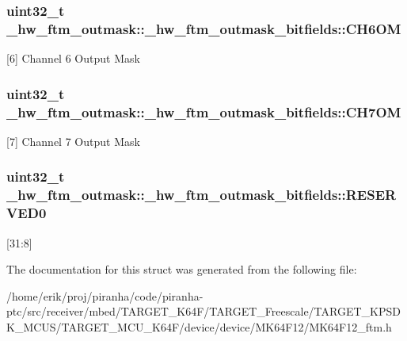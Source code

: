 \subsubsection[{\texorpdfstring{C\+H6\+OM}{CH6OM}}]{\setlength{\rightskip}{0pt plus 5cm}uint32\+\_\+t \+\_\+hw\+\_\+ftm\+\_\+outmask\+::\+\_\+hw\+\_\+ftm\+\_\+outmask\+\_\+bitfields\+::\+C\+H6\+OM}\hypertarget{struct__hw__ftm__outmask_1_1__hw__ftm__outmask__bitfields_a948594a699a50d533d19d157afd4f1a1}{}\label{struct__hw__ftm__outmask_1_1__hw__ftm__outmask__bitfields_a948594a699a50d533d19d157afd4f1a1}
\mbox{[}6\mbox{]} Channel 6 Output Mask 
\subsubsection[{\texorpdfstring{C\+H7\+OM}{CH7OM}}]{\setlength{\rightskip}{0pt plus 5cm}uint32\+\_\+t \+\_\+hw\+\_\+ftm\+\_\+outmask\+::\+\_\+hw\+\_\+ftm\+\_\+outmask\+\_\+bitfields\+::\+C\+H7\+OM}\hypertarget{struct__hw__ftm__outmask_1_1__hw__ftm__outmask__bitfields_accb7fef71e86c401304c16e0aacdfe04}{}\label{struct__hw__ftm__outmask_1_1__hw__ftm__outmask__bitfields_accb7fef71e86c401304c16e0aacdfe04}
\mbox{[}7\mbox{]} Channel 7 Output Mask 
\subsubsection[{\texorpdfstring{R\+E\+S\+E\+R\+V\+E\+D0}{RESERVED0}}]{\setlength{\rightskip}{0pt plus 5cm}uint32\+\_\+t \+\_\+hw\+\_\+ftm\+\_\+outmask\+::\+\_\+hw\+\_\+ftm\+\_\+outmask\+\_\+bitfields\+::\+R\+E\+S\+E\+R\+V\+E\+D0}\hypertarget{struct__hw__ftm__outmask_1_1__hw__ftm__outmask__bitfields_a931f5a85430a151b264e10fa558caa79}{}\label{struct__hw__ftm__outmask_1_1__hw__ftm__outmask__bitfields_a931f5a85430a151b264e10fa558caa79}
\mbox{[}31\+:8\mbox{]} 

The documentation for this struct was generated from the following file\+:\begin{DoxyCompactItemize}
\item 
/home/erik/proj/piranha/code/piranha-\/ptc/src/receiver/mbed/\+T\+A\+R\+G\+E\+T\+\_\+\+K64\+F/\+T\+A\+R\+G\+E\+T\+\_\+\+Freescale/\+T\+A\+R\+G\+E\+T\+\_\+\+K\+P\+S\+D\+K\+\_\+\+M\+C\+U\+S/\+T\+A\+R\+G\+E\+T\+\_\+\+M\+C\+U\+\_\+\+K64\+F/device/device/\+M\+K64\+F12/M\+K64\+F12\+\_\+ftm.\+h\end{DoxyCompactItemize}
